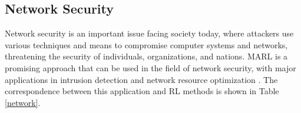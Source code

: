 \documentclass[acmsmall]{acmart}
\begin{document}
\subsection{Network Security} 
Network security is an important issue facing society today, where attackers use various techniques and means to compromise computer systems and networks, threatening the security of individuals, organizations, and nations. MARL is a promising approach that can be used in the field of network security, with major applications in intrusion detection \cite{10.1007/978-3-540-87805-6_15, SETHI2021102923, 9335796, mohamed2021adversarial, louati2022distributed, louati2022distributed} and network resource optimization \cite{9348210,SUN2020107230,9254093,li2019cooperative,9329087}.
The correspondence between this application and RL methods is shown in Table \ref{network}.
\end{document}

